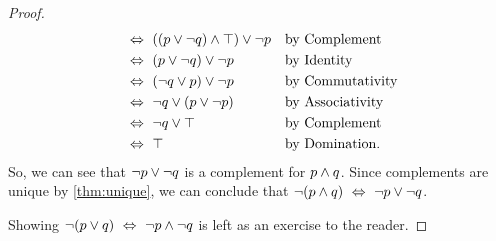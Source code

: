 \begin{proof}
\begin{alignat*}{2}
                                                &\iff \pn*{(p \join \neg q) \meet \top} \join \neg p &&\text{by Complement}\\
                                                &\iff (p \join \neg q) \join \neg p &&\text{by Identity}\\
                                                &\iff (\neg q \join p) \join \neg p &&\text{by Commutativity}\\
                                                &\iff \neg q \join (p \join \neg p) &&\text{by Associativity}\\
                                                &\iff \neg q \join \top &&\text{by Complement}\\
                                                &\iff \top &&\text{by Domination}.
    \end{alignat*}
    So, we can see that \(\neg p \vee \neg q\) is a complement for \(p \wedge q\).
    Since complements are unique by \autoref{thm:unique},
    we can conclude that \(\neg (p \wedge q) ~\Leftrightarrow~ \neg p \vee \neg q\).

    Showing \(\neg (p \vee q) ~\Leftrightarrow~ \neg p \wedge \neg q\) is left as an exercise to the reader.
\end{proof}


